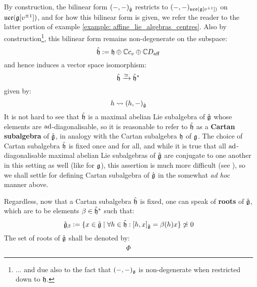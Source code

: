         By construction, the bilinear form $(-, -)_{\hat{\mathfrak{g}}}$ restricts to $(-, -)_{\mathfrak{uce}(\mathfrak{g}[v^{\pm 1}])}$ on $\mathfrak{uce}(\mathfrak{g}[v^{\pm 1}])$, and for how this bilinear form is given, we refer the reader to the latter portion of example \ref{example: affine_lie_algebras_centres}. Also by construction\footnote{... and due also to the fact that $(-, -)_{\mathfrak{g}}$ is non-degenerate when restricted down to $\mathfrak{h}$.}, this bilinear form remains non-degenerate on the subspace:
            $$\hat{\mathfrak{h}} := \mathfrak{h} \oplus \mathbb{C} c_v \oplus \mathbb{C} D_{\mathrm{aff}}$$
        and hence induces a vector space isomorphism:
            $$\hat{\mathfrak{h}} \xrightarrow[]{\simeq} \hat{\mathfrak{h}}^*$$
        given by:
            $$h \leadsto (h, -)_{\hat{\mathfrak{g}}}$$
        It is not hard to see that $\hat{\mathfrak{h}}$ is a maximal abelian Lie subalgebra of $\hat{\mathfrak{g}}$ whose elements are $\mathrm{ad}$-diagonalisable, so it is reasonable to refer to $\hat{\mathfrak{h}}$ as a \textbf{Cartan subalgebra} of $\hat{\mathfrak{g}}$, in analogy with the Cartan subalgebra $\mathfrak{h}$ of $\mathfrak{g}$. The choice of Cartan subalgebra $\hat{\mathfrak{h}}$ is fixed once and for all, and while it is true that all $\mathrm{ad}$-diagonalisable maximal abelian Lie subalgebras of $\hat{\mathfrak{g}}$ are conjugate to one another in this setting as well (like for $\mathfrak{g}$), this assertion is much more difficult (see \cite{kac_peterson_infinite_flag_varieties_and_conjugacy_of_cartan_subalgebras}), so we shall settle for defining  Cartan subalgebra of $\hat{\mathfrak{g}}$ in the somewhat \textit{ad hoc} manner above.

        Regardless, now that a Cartan subalgebra $\hat{\mathfrak{h}}$ is fixed, one can speak of \textbf{roots} of $\hat{\mathfrak{g}}$, which are to be elements $\beta \in \hat{\mathfrak{h}}^*$ such that:
            $$\hat{\mathfrak{g}}_{\beta} := \{ x \in \hat{\mathfrak{g}} \mid \forall h \in \hat{\mathfrak{h}}: [h, x]_{\hat{\mathfrak{g}}} = \beta(h) x \} \not \simeq 0$$
        The set of roots of $\hat{\mathfrak{g}}$ shall be denoted by:
            $$\hat{\Phi}$$
        
